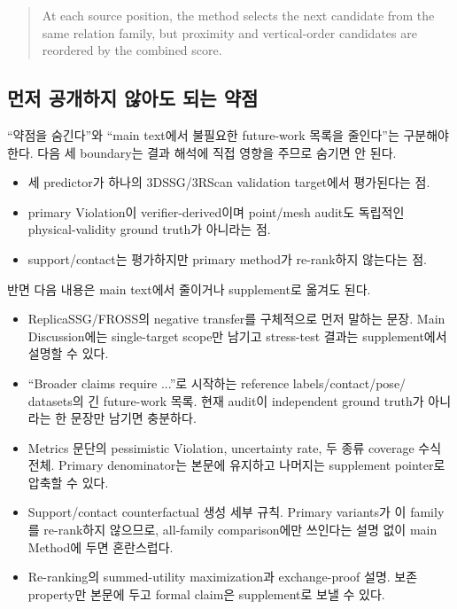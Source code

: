 \documentclass[11pt]{article}
\begin{document}
\begin{quote}
At each source position, the method selects the next candidate from the same
relation family, but proximity and vertical-order candidates are reordered by
the combined score.
\end{quote}

\subsection{먼저 공개하지 않아도 되는 약점}

``약점을 숨긴다''와 ``main text에서 불필요한 future-work 목록을 줄인다''는 구분해야
한다. 다음 세 boundary는 결과 해석에 직접 영향을 주므로 숨기면 안 된다.

\begin{itemize}[leftmargin=2em]
    \item 세 predictor가 하나의 3DSSG/3RScan validation target에서 평가된다는 점.
    \item primary Violation이 verifier-derived이며 point/mesh audit도 독립적인
    physical-validity ground truth가 아니라는 점.
    \item support/contact는 평가하지만 primary method가 re-rank하지 않는다는 점.
\end{itemize}

반면 다음 내용은 main text에서 줄이거나 supplement로 옮겨도 된다.

\begin{itemize}[leftmargin=2em]
    \item ReplicaSSG/FROSS의 negative transfer를 구체적으로 먼저 말하는 문장. Main
    Discussion에는 single-target scope만 남기고 stress-test 결과는 supplement에서
    설명할 수 있다.
    \item ``Broader claims require ...''로 시작하는 reference labels/contact/pose/
    datasets의 긴 future-work 목록. 현재 audit이 independent ground truth가 아니라는
    한 문장만 남기면 충분하다.
    \item Metrics 문단의 pessimistic Violation, uncertainty rate, 두 종류 coverage
    수식 전체. Primary denominator는 본문에 유지하고 나머지는 supplement pointer로
    압축할 수 있다.
    \item Support/contact counterfactual 생성 세부 규칙. Primary variants가 이
    family를 re-rank하지 않으므로, all-family comparison에만 쓰인다는 설명 없이
    main Method에 두면 혼란스럽다.
    \item Re-ranking의 summed-utility maximization과 exchange-proof 설명. 보존
    property만 본문에 두고 formal claim은 supplement로 보낼 수 있다.
\end{itemize}
\end{document}
